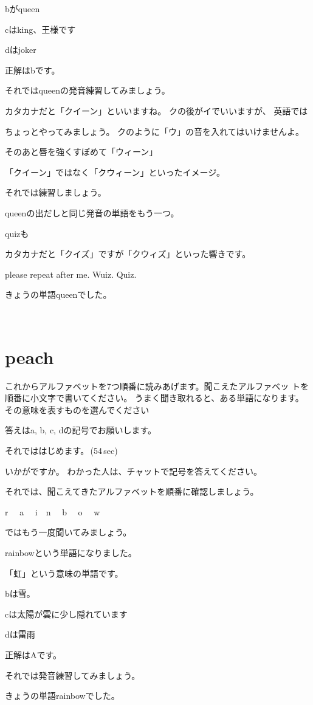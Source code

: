 \documentclass[12pt]{jlreq}
\let\textipa\undefined
\begin{document}
bがqueen

cはking、王様です

dはjoker


正解はbです。

それではqueenの発音練習してみましょう。

カタカナだと「クイーン」といいますね。
クの後がイでいいますが、
英語では\textipa{/kw/}

ちょっとやってみましょう。
\textipa{/k/}
クのように「ウ」の音を入れてはいけませんよ。

そのあと唇を強くすぼめて「ウィーン」

「クイーン」ではなく「クウィーン」といったイメージ。

それでは練習しましょう。

queenの出だしと同じ発音の単語をもう一つ。

quizも\textipa{/kwiz/}

カタカナだと「クイズ」ですが「クウィズ」といった響きです。

please repeat after me. Wuiz. Quiz.

きょうの単語queenでした。

{\large \ComputerMouse}\,\,

\newpage
\section{peach}

これからアルファベットを7つ順番に読みあげます。聞こえたアルファベッ
トを順番に小文字で書いてください。
うまく聞き取れると、ある単語になります。
その意味を表すものを選んでください

答えはa, b, c, dの記号でお願いします。

それでははじめます。\faVolumeUp\,(54\,sec)

いかがですか。
わかった人は、チャットで記号を答えてください。

それでは、聞こえてきたアルファベットを順番に確認しましょう。{\large \ComputerMouse}

r\,\,
{\large \ComputerMouse}\,\,
a\,\,
{\large \ComputerMouse}\,\,
i
{\large \ComputerMouse}\,\,
n\,\,
{\large \ComputerMouse}\,\,
b\,\,
{\large \ComputerMouse}\,\,
o\,\,
{\large \ComputerMouse}\,\,
w\,\,

ではもう一度聞いてみましょう。

rainbowという単語になりました。

「虹」という意味の単語です。


bは雪。

cは太陽が雲に少し隠れています

dは雷雨


正解はAです。

それでは発音練習してみましょう。

きょうの単語rainbowでした。

{\large \ComputerMouse}\,\,
\end{document}
